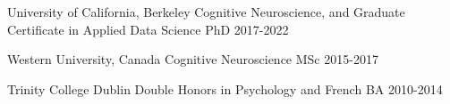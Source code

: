 
\begin{cvhonors}


 \cvhonor
    {University of California, Berkeley} %
    {Cognitive Neuroscience, and Graduate Certificate in Applied Data Science}
    {PhD} 
    {2017-2022}
  	
 \cvhonor
    {Western University, Canada} %
    {Cognitive Neuroscience}
    {MSc} 
    {2015-2017}
  	
 \cvhonor
    {Trinity College Dublin} %
    {Double Honors in Psychology and French}
    {BA} 
    {2010-2014}
    
\end{cvhonors}




